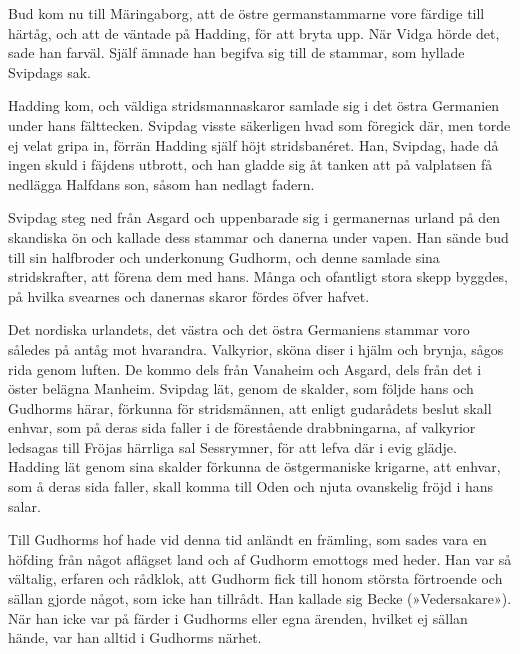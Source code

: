 Bud kom nu till Märingaborg, att de östre germanstammarne vore färdige
till härtåg, och att de väntade på Hadding, för att bryta upp. När Vidga
hörde det, sade han farväl. Själf ämnade han begifva sig till de
stammar, som hyllade Svipdags sak.

Hadding kom, och väldiga stridsmannaskaror samlade sig i det östra
Germanien under hans fälttecken. Svipdag visste säkerligen hvad som
föregick där, men torde ej velat gripa in, förrän Hadding själf höjt
stridsbanéret. Han, Svipdag, hade då ingen skuld i fäjdens utbrott, och
han gladde sig åt tanken att på valplatsen få nedlägga Halfdans son,
såsom han nedlagt fadern.

Svipdag steg ned från Asgard och uppenbarade sig i germanernas urland på
den skandiska ön och kallade dess stammar och danerna under vapen. Han
sände bud till sin halfbroder och underkonung Gudhorm, och denne samlade
sina stridskrafter, att förena dem med hans. Många och ofantligt stora
skepp byggdes, på hvilka svearnes och danernas skaror fördes öfver
hafvet.

Det nordiska urlandets, det västra och det östra Germaniens stammar voro
således på antåg mot hvarandra. Valkyrior, sköna diser i hjälm och
brynja, sågos rida genom luften. De kommo dels från Vanaheim och Asgard,
dels från
\protect\hypertarget{lb1625905.xhtmlux5cux23start158}{}{}\protect\hypertarget{lb1625905.xhtmlux5cux23start158-a}{}{}\protect\hypertarget{lb1625905.xhtmlux5cux23start158-b}{}{}\protect\hypertarget{lb1625905.xhtmlux5cux23start158-c}{}{}\protect\hypertarget{lb1625905.xhtmlux5cux23start158-d}{}{}
det i öster belägna Manheim. Svipdag lät, genom de skalder, som följde
hans och Gudhorms härar, förkunna för stridsmännen, att enligt
gudarådets beslut skall enhvar, som på deras sida faller i de
förestående drabbningarna, af valkyrior ledsagas till Fröjas härrliga
sal Sessrymner, för att lefva där i evig glädje. Hadding lät genom sina
skalder förkunna de östgermaniske krigarne, att enhvar, som å deras sida
faller, skall komma till Oden och njuta ovanskelig fröjd i hans salar.

Till Gudhorms hof hade vid denna tid anländt en främling, som sades vara
en höfding från något aflägset land och af Gudhorm emottogs med heder.
Han var så vältalig, erfaren och rådklok, att Gudhorm fick till honom
största förtroende och sällan gjorde något, som icke han tillrådt. Han
kallade sig Becke (»Vedersakare»). När han icke var på färder i Gudhorms
eller egna ärenden, hvilket ej sällan hände, var han alltid i Gudhorms
närhet.

